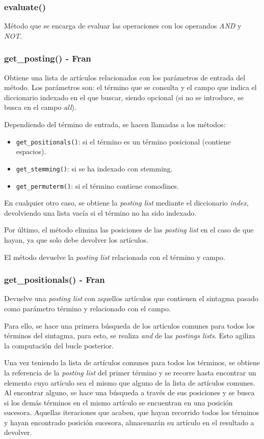 \documentclass[12pt,a4paper]{article}
\begin{document}
\subsubsection{evaluate()}
Método que se encarga de evaluar las operaciones con los operandos \textit{AND} y \textit{NOT}.

\subsubsection{get\_posting() - Fran}
Obtiene una lista de artículos relacionados con los parámetros de entrada del método.
Los parámetros son: el término que se consulta y el campo que indica el diccionario indexado en el que buscar, siendo opcional (si no se introduce, se busca en el campo \textit{all}).

Dependiendo del término de entrada, se hacen llamadas a los métodos:
\begin{itemize}
    \item \texttt{get\_positionals()}: si el término es un término posicional (contiene espacios).
    \item \texttt{get\_stemming()}: si se ha indexado con stemming.
    \item \texttt{get\_permuterm()}: si el término contiene comodines.
\end{itemize}

En cualquier otro caso, se obtiene la \textit{posting list} mediante el diccionario \textit{index}, devolviendo una lista vacía si el término no ha sido indexado.

Por último, el método elimina las posiciones de las \textit{posting list} en el caso de que hayan, ya que solo debe devolver los artículos.

El método devuelve la \textit{posting list} relacionada con el término y campo.

\subsubsection{get\_positionals() - Fran}
Devuelve una \textit{posting list} con aquellos artículos que contienen el sintagma pasado como parámetro término y relacionado con el campo.

Para ello, se hace una primera búsqueda de los artículos comunes para todos los términos del sintagma, para esto, se realiza \textit{and} de las \textit{postings lists}. Esto agiliza la computación del bucle posterior.

Una vez teniendo la lista de artículos comunes para todos los términos, se obtiene la referencia de la \textit{posting list} del primer término y se recorre hasta encontrar un elemento cuyo artículo sea el mismo que alguno de la lista de artículos comunes. Al encontrar alguno, se hace una búsqueda a través de sus posiciones y se busca si los demás términos en el mismo artículo se encuentran en una posición sucesora. Aquellas iteraciones que acaben, que hayan recorrido todos los términos y hayan encontrado posición sucesora, almacenarán su artículo en el resultado a devolver.
\end{document}
